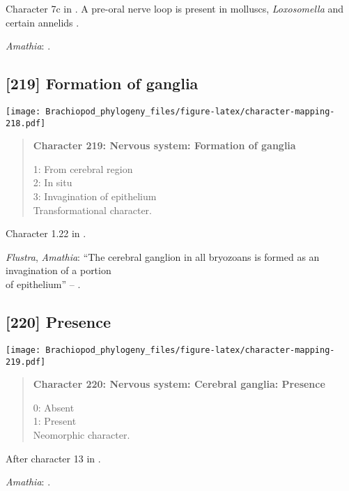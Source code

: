 \documentclass[openany]{book}
\theoremstyle{definition}
\theoremstyle{definition}
\theoremstyle{definition}
\theoremstyle{remark}
\begin{document}
Character 7c in \citet{Haszprunar2008}. A pre-oral nerve loop is present
in molluscs, \emph{Loxosomella} and certain annelids
\citep{Wanninger2007}.

\hypertarget{Amathia-coding-218}{}
\emph{Amathia}: \citet{Temereva2016Thenervous}.

\subsection*{{[}219{]} Formation of ganglia}\label{formation-of-ganglia}

\texttt{[image: Brachiopod\_phylogeny\_files/figure-latex/character-mapping-218.pdf]}

\begin{quote}
\textbf{Character 219: Nervous system: Formation of ganglia}

1: From cerebral region\\
2: In situ\\
3: Invagination of epithelium\\
Transformational character.
\end{quote}

Character 1.22 in \citet{SPS1996}.

\hypertarget{Amathia-coding-219}{}
\emph{Flustra}, \emph{Amathia}: ``The cerebral ganglion in all bryozoans
is formed as an invagination of a portion\\
of epithelium'' -- \citet{Temereva2016Thenervous}.

\subsection*{{[}220{]} Presence}\label{presence-6}

\texttt{[image: Brachiopod\_phylogeny\_files/figure-latex/character-mapping-219.pdf]}

\begin{quote}
\textbf{Character 220: Nervous system: Cerebral ganglia: Presence}

0: Absent\\
1: Present\\
Neomorphic character.
\end{quote}

After character 13 in \citet{Haszprunar1996}.

\hypertarget{Amathia-coding-220}{}
\emph{Amathia}: \citet{Temereva2016Thenervous}.
\end{document}
